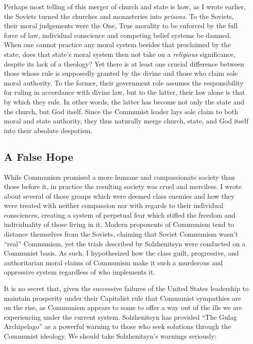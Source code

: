 \documentclass{article}
\begin{document}
Perhaps most telling of this merger of church and state is how, as I wrote earlier, the Soviets turned the churches and monasteries into \emph{prisons}.  To the Soviets, their moral judgements were the One, True morality to be enforced by the full force of law, individual conscience and competing belief systems be damned.  When one cannot practice any moral system besides that proclaimed by the state, does that state's moral system then not take on a \emph{religious} significance, despite its lack of a theology?  Yet there is at least one crucial difference between those whose rule is supposedly granted by the divine and those who claim sole moral authority.  To the former, their government role assumes the responsibility for ruling in accordance with divine law, but to the latter, their law alone is that by which they rule.  In other words, the latter has become not only the state and the church, but God itself.  Since the Communist leader lays sole claim to both moral and state authority, they thus naturally merge church, state, and God itself into their absolute despotism.

\subsection{A False Hope}

While Communism promised a more humane and compassionate society than those before it, in practice the resulting society was cruel and merciless.  I wrote about several of those groups which were deemed class enemies and how they were treated with neither compassion nor with regards to their individual consciences, creating a system of perpetual fear which stifled the freedom and individuality of those living in it.  Modern proponents of Communism tend to distance themselves from the Soviets, claiming that Soviet Communism wasn't ``real'' Communism, yet the trials described by Solzhenitsyn were conducted on a Communist basis.  As such, I hypothesized how the class guilt, progressive, and authoritarian moral claims of Communism make it such a murderous and oppressive system regardless of who implements it.

It is no secret that, given the successive failures of the United States leadership to maintain prosperity under their Capitalist rule that Communist sympathies are on the rise, as Communism appears to some to offer a way out of the ills we are experiencing under the current system.  Solzhenitsyn has provided ``The Gulag Archipelago'' as a powerful warning to those who seek solutions through the Communist ideology.  We should take Solzhenitsyn's warnings seriously:
\end{document}
